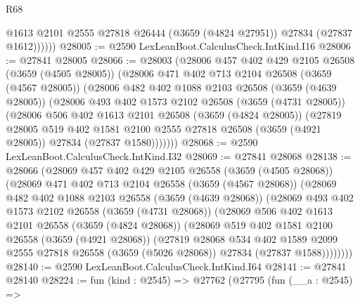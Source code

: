 \begin{lexlean}{R68}
\begin{coremodule}
              @1613
              @2101
              @2555
              @27818
              @26444
              (@3659 (@4824 @27951))
              @27834
              (@27837 @1612))))))
@28005 := @2590 LexLeanBoot.CalculusCheck.IntKind.I16
@28006 := @27841 @28005
@28066 := @28003
    (@28006
      @457
      @402
      @429
      @2105
      @26508
      (@3659 (@4505 @28005))
      (@28006
        @471
        @402
        @713
        @2104
        @26508
        (@3659 (@4567 @28005))
        (@28006
          @482
          @402
          @1088
          @2103
          @26508
          (@3659 (@4639 @28005))
          (@28006
            @493
            @402
            @1573
            @2102
            @26508
            (@3659 (@4731 @28005))
            (@28006
              @506
              @402
              @1613
              @2101
              @26508
              (@3659 (@4824 @28005))
              (@27819
                @28005
                @519
                @402
                @1581
                @2100
                @2555
                @27818
                @26508
                (@3659 (@4921 @28005))
                @27834
                (@27837 @1580)))))))
@28068 := @2590 LexLeanBoot.CalculusCheck.IntKind.I32
@28069 := @27841 @28068
@28138 := @28066
    (@28069
      @457
      @402
      @429
      @2105
      @26558
      (@3659 (@4505 @28068))
      (@28069
        @471
        @402
        @713
        @2104
        @26558
        (@3659 (@4567 @28068))
        (@28069
          @482
          @402
          @1088
          @2103
          @26558
          (@3659 (@4639 @28068))
          (@28069
            @493
            @402
            @1573
            @2102
            @26558
            (@3659 (@4731 @28068))
            (@28069
              @506
              @402
              @1613
              @2101
              @26558
              (@3659 (@4824 @28068))
              (@28069
                @519
                @402
                @1581
                @2100
                @26558
                (@3659 (@4921 @28068))
                (@27819
                  @28068
                  @534
                  @402
                  @1589
                  @2099
                  @2555
                  @27818
                  @26558
                  (@3659 (@5026 @28068))
                  @27834
                  (@27837 @1588))))))))
@28140 := @2590 LexLeanBoot.CalculusCheck.IntKind.I64
@28141 := @27841 @28140
@28224 := fun (kind : @2545) =>
  @27762
    (@27795
      (fun (__a : @2545) =>

\end{coremodule}
\end{lexlean}
